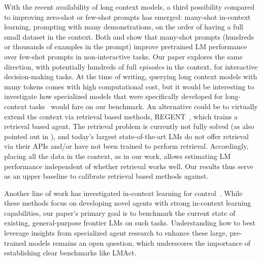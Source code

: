 With the recent availability of long context models, a third possibility compared to improving zero-shot or few-shot prompts has emerged: many-shot in-context learning, \ie prompting with many demonstrations, on the order of having a full small dataset in the context.
Both \citet{agarwal2024many} and \citet{jiang2024many} show that many-shot prompts (hundreds or thousands of examples in the prompt) improve pretrained LM performance over few-shot prompts in non-interactive tasks.
Our paper explores the same direction, with potentially hundreds of full \emph{episodes} in the context, for interactive decision-making tasks.
At the time of writing, querying long context models with many tokens comes with high computational cost, but it would be interesting to investigate how specialized models that were specifically developed for long-context tasks~\citep{bulatov2022recurrent, cherepanov2024recurrent} would fare on our benchmark.
An alternative could be to virtually extend the context via retrieval based methods, \eg REGENT~\citep{sridhar2024regent}, which trains a retrieval based agent.
The retrieval problem is currently not fully solved (as also pointed out in \citet{paglieri2025balrog}), and today's largest state-of-the-art LMs do not offer retrieval via their APIs and/or have not been trained to perform retrieval.
Accordingly, placing all the data in the context, as in our work, allows estimating LM performance independent of whether retrieval works well.
Our results thus serve as an upper baseline to calibrate retrieval based methods against.

Another line of work has investigated in-context learning for control~\citep{duan2017oneshot, xu2022prompting, fu2024incontext, fang2024moka, yin2024incontext, wang2024prompt}.
While these methods focus on developing novel agents with strong in-context learning capabilities, our paper's primary goal is to benchmark the current state of existing, general-purpose frontier LMs on such tasks.
Understanding how to best leverage insights from specialized agent research to enhance these large, pre-trained models remains an open question, which underscores the importance of establishing clear benchmarks like LMAct.


